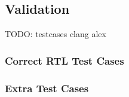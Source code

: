\subsection{Validation}
\label{sec:irgen_validation}

TODO: testcases clang alex

\subsubsection{Correct RTL Test Cases}

%

\subsubsection{Extra Test Cases}

%
%
